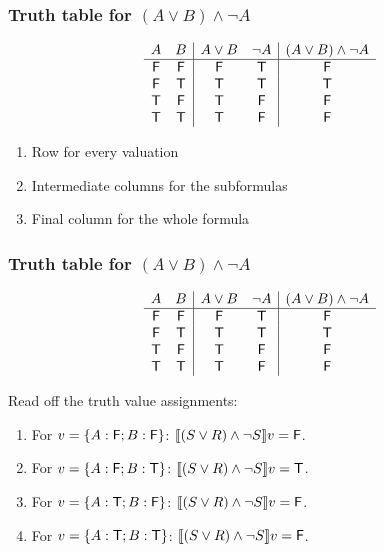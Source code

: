 \documentclass[xetex,aspectratio=169,14pt,hyperref={pdfpagelabels=true,pdflang={en-GB}}]{beamer}
\begin{document}
\begin{frame}[t]
  \frametitle{Truth table for $(A \lor B) \land \lnot A$}
  {\scriptsize \begin{displaymath}
    \begin{array}{cc|cc|c}
      A&B&A \lor B&\lnot A& (A \lor B) \land \lnot A\\
      \hline
      \mathsf{F}&\mathsf{F}&\mathsf{F}&\mathsf{T}&\mathsf{F}\\
      \mathsf{F}&\mathsf{T} &\mathsf{T} &\mathsf{T}&\mathsf{T}\\
      \mathsf{T} &\mathsf{F}&\mathsf{T} &\mathsf{F}&\mathsf{F}\\
      \mathsf{T} &\mathsf{T} &\mathsf{T} &\mathsf{F}&\mathsf{F}\\
    \end{array}
  \end{displaymath}}

  \begin{enumerate}
  \item Row for every valuation
  \item Intermediate columns for the subformulas
  \item Final column for the whole formula
  \end{enumerate}
\end{frame}

\begin{frame}[t]
  \frametitle{Truth table for $(A \lor B) \land \lnot A$}
  {\scriptsize \begin{displaymath}
      \begin{array}{cc|cc|c}
        A&B&A \lor B&\lnot A& (A \lor B) \land \lnot A\\
        \hline
        \mathsf{F}&\mathsf{F}&\mathsf{F}&\mathsf{T}&\mathsf{F}\\
        \mathsf{F}&\mathsf{T} &\mathsf{T} &\mathsf{T}&\mathsf{T}\\
        \mathsf{T} &\mathsf{F}&\mathsf{T} &\mathsf{F}&\mathsf{F}\\
        \mathsf{T} &\mathsf{T} &\mathsf{T} &\mathsf{F}&\mathsf{F}\\
      \end{array}
    \end{displaymath}}

  Read off the truth value assignments:
  \begin{enumerate}
  \item For $v = \{A : \mathsf{F}; B : \mathsf{F}\}$: $\llbracket (S \lor R) \land \lnot S \rrbracket v = \mathsf{F}$.
  \item For $v = \{A : \mathsf{F}; B : \mathsf{T}\}$: $\llbracket (S \lor R) \land \lnot S \rrbracket v = \mathsf{T}$.
  \item For $v = \{A : \mathsf{T}; B : \mathsf{F}\}$: $\llbracket (S \lor R) \land \lnot S \rrbracket v = \mathsf{F}$.
  \item For $v = \{A : \mathsf{T}; B : \mathsf{T}\}$: $\llbracket (S \lor R) \land \lnot S \rrbracket v = \mathsf{F}$.
  \end{enumerate}
\end{frame}
\end{document}
